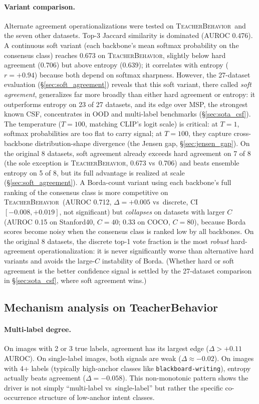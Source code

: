 \documentclass[a4paper,fleqn]{cas-sc}
\newcommand{\tb}{\textsc{TeacherBehavior}}
\begin{document}
\paragraph{Variant comparison.}
\label{sec:variants}
Alternate agreement operationalizations were tested on \tb\ and the seven other datasets.
Top-3 Jaccard similarity is dominated (AUROC 0.476). A continuous soft variant (each backbone's mean softmax probability on the consensus class) reaches 0.673 on \tb, slightly below hard agreement (0.706) but above entropy (0.639); it correlates with entropy ($r=+0.94$) because both depend on softmax sharpness.
However, the 27-dataset evaluation (\S\ref{sec:soft_agreement}) reveals that this soft variant, there called \emph{soft agreement}, generalizes far more broadly than either hard agreement or entropy: it outperforms entropy on 23 of 27 datasets, and its edge over MSP, the strongest known CSF, concentrates in OOD and multi-label benchmarks (\S\ref{sec:sota_csf}).
The temperature ($T=100$, matching CLIP's logit scale) is critical: at $T=1$, softmax probabilities are too flat to carry signal; at $T=100$, they capture cross-backbone distribution-shape divergence (the Jensen gap, \S\ref{sec:jensen_gap}).
On the original 8 datasets, soft agreement already exceeds hard agreement on 7 of 8 (the sole exception is \tb, 0.673 vs~0.706) and beats ensemble entropy on 5 of 8, but its full advantage is realized at scale (\S\ref{sec:soft_agreement}).
A Borda-count variant using each backbone's full ranking of the consensus class is more competitive on \tb\ (AUROC 0.712, $\Delta=+0.005$ vs~discrete, CI~$[-0.008,+0.019]$, not significant) but \emph{collapses} on datasets with larger $C$ (AUROC 0.15 on Stanford40, $C{=}40$; 0.33 on COCO, $C{=}80$), because Borda scores become noisy when the consensus class is ranked low by all backbones.
On the original 8 datasets, the discrete top-1 vote fraction is the most \emph{robust} hard-agreement operationalization: it is never significantly worse than alternative hard variants and avoids the large-$C$ instability of Borda.
(Whether hard or soft agreement is the better confidence signal is settled by the 27-dataset comparison in \S\ref{sec:sota_csf}, where soft agreement wins.)

\subsection{Mechanism analysis on TeacherBehavior}
\label{sec:mechanism}

\paragraph{Multi-label degree.}
On images with 2 or 3 true labels, agreement has its largest edge ($\Delta > +0.11$ AUROC).
On single-label images, both signals are weak ($\Delta \approx -0.02$).
On images with 4+ labels (typically high-anchor classes like \texttt{blackboard-writing}), entropy actually beats agreement ($\Delta = -0.058$).
This non-monotonic pattern shows the driver is not simply ``multi-label vs~single-label'' but rather the specific co-occurrence structure of low-anchor intent classes.
\end{document}
